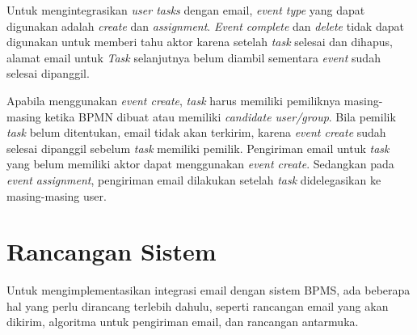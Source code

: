 \begin{enumerate}
Untuk mengintegrasikan \textit{user tasks} dengan email, \textit{event type} yang dapat digunakan adalah \textit{create} dan \textit{assignment}. \textit{Event complete} dan \textit{delete} tidak dapat digunakan untuk memberi tahu aktor karena setelah \textit{task} selesai dan dihapus, alamat email untuk \textit{Task} selanjutnya belum diambil sementara \textit{event} sudah selesai dipanggil.

Apabila menggunakan \textit{event create}, \textit{task} harus memiliki pemiliknya masing-masing ketika BPMN dibuat atau memiliki \textit{candidate user/group}. Bila pemilik \textit{task} belum ditentukan, email tidak akan terkirim, karena \textit{event create} sudah selesai dipanggil sebelum \textit{task} memiliki pemilik. Pengiriman email untuk \textit{task} yang belum memiliki aktor dapat menggunakan \textit{event create}. Sedangkan pada \textit{event assignment}, pengiriman email dilakukan setelah \textit{task} didelegasikan ke masing-masing user.


\end{enumerate}


\section{Rancangan Sistem}
\label{sec:analisisdanperancangan_rancangansistem}
Untuk mengimplementasikan integrasi email dengan sistem BPMS, ada beberapa hal yang perlu dirancang terlebih dahulu, seperti rancangan email yang akan dikirim, algoritma untuk pengiriman email, dan rancangan antarmuka.

